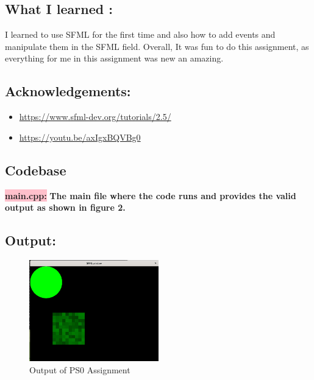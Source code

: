 \subsection{What I learned :}\label{sec:ps0:learn}

I learned to use SFML for the first time and also how to add events and manipulate them in the SFML field.
Overall, It was fun to do this assignment, as everything for me in this assignment was new an amazing.


\subsection{Acknowledgements:}
\begin{itemize}
    \item \url{https://www.sfml-dev.org/tutorials/2.5/}
    \item \url{https://youtu.be/axIgxBQVBg0}
\end{itemize}


\subsection{Codebase}\label{sec:ps0:code}

\colorbox{pink}{\textbf{main.cpp:}} \newline \textbf{The main file where the code runs and provides the valid output as shown in figure 2.}



\subsection{Output:}\label{sec:ps0:output}
\begin{figure}[h]
    \centering
    \includegraphics[width=0.5\textwidth]{ps0/Screenshot.png}
    \caption{Output of PS0 Assignment}
    \label{fig:ps0}
\end{figure}
